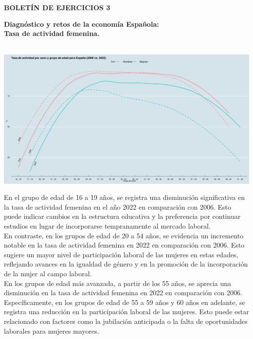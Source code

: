 \begin{center}	
\textbf{BOLETÍN DE EJERCICIOS 3}
\end{center}

\vspace{2cm}

\textbf{Diagnóstico y retos de la economía Española:\\
	Tasa de actividad femenina.}\\\\

    \begin{center}
	\includegraphics[scale=.32]{image/b3ej1e.png}
    \end{center}
    \vspace{.5cm}


En el grupo de edad de 16 a 19 años, se registra una disminución significativa en la tasa de actividad femenina en el año 2022 en comparación con 2006. Esto puede indicar cambios en la estructura educativa y la preferencia por continuar estudios en lugar de incorporarse tempranamente al mercado laboral.\\

En contraste, en los grupos de edad de 20 a 54 años, se evidencia un incremento notable en la tasa de actividad femenina en 2022 en comparación con 2006. Esto sugiere un mayor nivel de participación laboral de las mujeres en estas edades, reflejando avances en la igualdad de género y en la promoción de la incorporación de la mujer al campo laboral.\\

En los grupos de edad más avanzada, a partir de los 55 años, se aprecia una disminución en la tasa de actividad femenina en 2022 en comparación con 2006. Específicamente, en los grupos de edad de 55 a 59 años y 60 años en adelante, se registra una reducción en la participación laboral de las mujeres. Esto puede estar relacionado con factores como la jubilación anticipada o la falta de oportunidades laborales para mujeres mayores.\\

